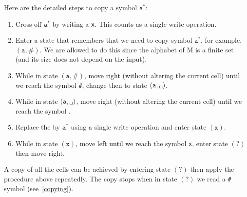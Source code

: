 \documentclass{article}
\newcommand{\obullet}[1]{\ensuremath{#1^*}}
\newcommand{\0}{\texttt{\textvisiblespace}}
\newcommand{\°}{\obullet{\0}}
\newcommand{\A}{\obullet{\s}}
\newcommand{\s}{\texttt{a}}
\newcommand{\X}{\texttt{x}}
\newcommand{\e}{\texttt{\#}}
\begin{document}
Here are the detailed steps to copy a symbol \A{}:
\begin{enumerate}
	\item Cross off \A{} by writing a \X{}. This
		counts as a single write operation.
	\item Enter a state that remembers that we need to copy symbol
		\A{}, for example, \((\s,\e)\). We are allowed
		to do this since the alphabet of M is a finite set (and its size does not
		depend on the input).
	\item While in state \((\s,\e)\), move right (without
		altering the current cell) until we reach
		the symbol \e, change then to state
		\((\s,\0{})\).
	\item While in state \((\s,\0{})\), move right (without
	altering the current cell) until we reach the symbol \0{}.
	\item Replace the \0{} by \A{} using a
		single write operation and enter state \((\texttt{x})\).
	\item While in state \((\texttt{x})\), move left until we reach
		the symbol \X{}, enter state \((\texttt{?})\)
		then move right.
\end{enumerate}
A copy of all the cells can be achieved by entering state \((\texttt{?})\)
then apply the procedure above repeatedly.
The copy stops when in state \((\texttt{?})\) we read a \e{}
symbol (see~\ref{copying}).
\end{document}
